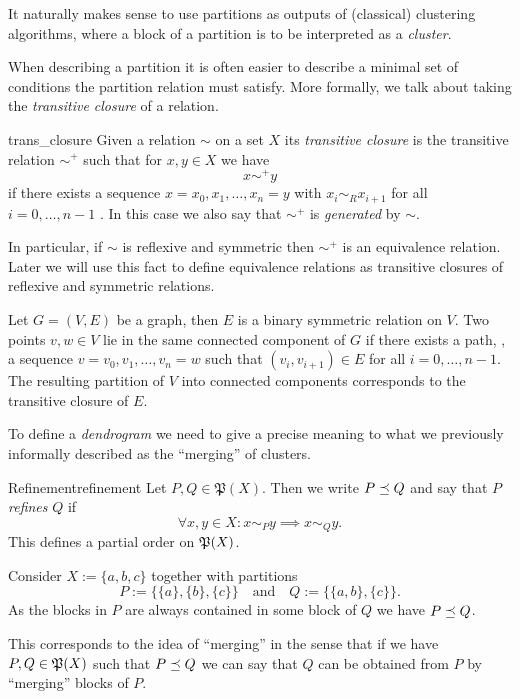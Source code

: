 It naturally makes sense to use partitions as outputs of (classical) clustering algorithms, where a block of a partition is to be interpreted as a \emph{cluster}.

When describing a partition it is often easier to describe a minimal set of conditions the partition relation must satisfy. More formally, we talk about taking the \emph{transitive closure} of a relation.

\begin{definition}{}{trans_closure}
    Given a relation $\sim$ on a set $X$ its \emph{transitive closure} is the transitive relation $\sim^+$ such that for $x,y \in X$ we have
    $$
    x \sim^+ y
    $$
    if there exists a sequence $x = x_0, x_1, \dots, x_n = y$ with $x_i \sim_R x_{i+1}$ for all ${i = 0, \dots, n-1}$ \cite[p.337]{Lidl1997-kc}. In this case we also say that $\sim^+$ is \emph{generated} by $\sim$.
\end{definition}

In particular, if $\sim$ is reflexive and symmetric then $\sim^+$ is an equivalence relation.
Later we will use this fact to define equivalence relations as transitive closures of reflexive and symmetric relations.

\begin{example}{}{}
Let $G = (V,E)$ be a graph, then $E$ is a binary symmetric relation on $V$. Two points $v,w \in V$ lie in the same connected component of $G$ if there exists a path, \ie, a sequence $v =v_0, v_1, \dots, v_n = w$ such that $(v_i, v_{i+1}) \in E$ for all $i = 0, \dots, n-1$. The resulting partition of $V$ into connected components corresponds to the transitive closure of $E$.
\end{example}

To define a \emph{dendrogram} we need to give a precise meaning to what we previously informally described as the ``merging'' of clusters.

\begin{definition}{Refinement}{refinement}
Let $P, Q \in \mathfrak{P}(X)$. Then we write $P \refines Q$ and say that $P$ \emph{refines} $Q$ if
\begin{equation*}
    \forall x,y \in X: x \sim_P y \implies x \sim_Q y.
\end{equation*}
This defines a partial order on $\P(X)$.
\end{definition}

\begin{example}{}{}
Consider $X := \{a,b,c\}$ together with partitions
$$
P := \{\{a\}, \{b\}, \{c\}\} \quad \text{and} \quad Q := \{\{a,b\}, \{c\}\}.
$$
As the blocks in $P$ are always contained in some block of $Q$ we have $P \refines Q$.
\end{example}
This corresponds to the idea of ``merging'' in the sense that if we have $P,Q \in \P(X)$ such that $P \refines Q$ we can say that $Q$ can be obtained from $P$ by ``merging'' blocks of $P$.

